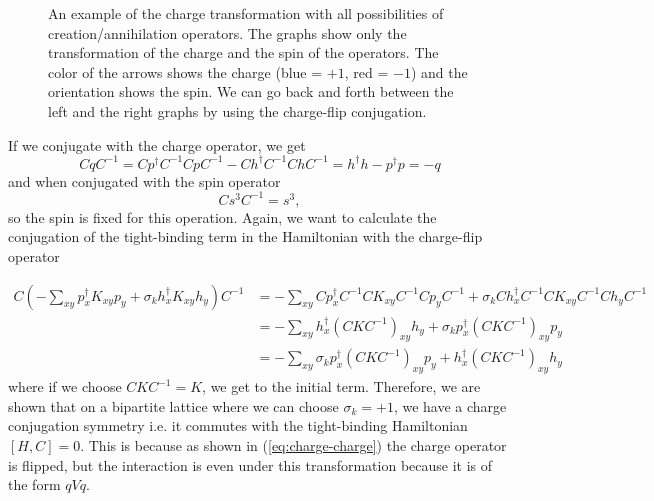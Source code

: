 \begin{figure}
\begin{center}
  \end{center}
  \caption{An example of the charge transformation with all possibilities of creation/annihilation operators. The graphs show only the transformation of the charge and the spin of the operators. The color of the arrows shows the charge (blue = $+1$, red = $-1$) and the orientation shows the spin. We can go back and forth between the left and the right graphs by using the charge-flip conjugation.}
  \label{fig:charge-flip}
\end{figure}
If we conjugate with the charge operator, we get
\begin{equation}
  CqC^{-1} = Cp^\dagger C^{-1}CpC^{-1} - Ch^\dagger C^{-1}ChC^{-1} = h^\dagger h - p^\dagger p = -q
  \label{eq:charge-charge}
\end{equation}
and when conjugated with the spin operator
\begin{equation}
  Cs^3C^{-1} = s^3,
\end{equation}
so the spin is fixed for this operation. Again, we want to calculate the conjugation of the tight-binding term in the Hamiltonian with the charge-flip operator

\begin{align*}
  C\left( -\sum_{xy} p^\dagger_x K_{xy} p_y + \sigma_k h^\dagger_x K_{xy} h_y\right) C^{-1} &= -\sum_{xy} C p^\dagger_x C^{-1}C K_{xy} C^{-1}C p_y C^{-1} + \sigma_k C h^\dagger_x C^{-1}C K_{xy} C^{-1}C h_y C^{-1}
  \\
  &= -\sum_{xy}  h^\dagger_x (C K C^{-1})_{xy} h_y + \sigma_k p^\dagger_x (C K C^{-1})_{xy} p_y
  \\
  &= -\sum_{xy}  \sigma_k p^\dagger_x (C K C^{-1})_{xy} p_y + h^\dagger_x (C K C^{-1})_{xy} h_y
\end{align*}
where if we choose $CKC^{-1} = K$, we get to the initial term. Therefore, we are shown that on a bipartite lattice where we can choose $\sigma_k = +1$, we have a charge conjugation symmetry i.e. it commutes with the tight-binding Hamiltonian $[H,C] = 0$. This is because as shown in (\ref{eq:charge-charge}) the charge operator is flipped, but the interaction is even under this transformation because it is of the form $qVq$.

